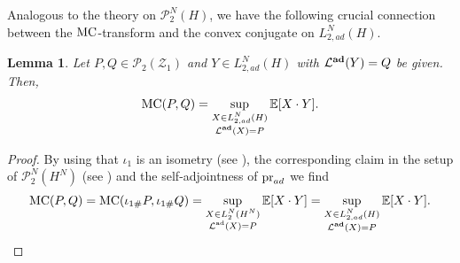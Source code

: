 \documentclass[a4paper]{amsart}
\numberwithin{theorem}{section}
\newtheorem{lemma}[theorem]{Lemma}
\theoremstyle{definition}
\newcommand{\E}{\mathbb{E}}
\newcommand{\pr}{\textup{pr}}
\newcommand{\law}{\mathcal{L}}
\newcommand{\Pc}{\mathcal P}
\renewcommand{\H}{H}
\newcommand{\mc}{\textup{MC}}
\newcommand{\lawad}{\law^{\textup{ad}}}
\newcommand{\Zc}{\mathcal{Z}}
\newcommand{\lawadd}{\law^{\textnormal{\textbf{ad}}}}
\begin{document}
\medskip









Analogous to the theory on $\Pc_2^N(H)$, we have the following crucial connection between the $\mc$-transform and the convex conjugate on $L_{2,ad}^N(\H)$. 

\begin{lemma}\label{lem:FP_XY}
Let $P,Q \in \Pc_2(\Zc_1)$ and $Y \in L_{2,ad}^N(\H)$ with $\lawadd(Y)=Q$ be given. Then,
\[
\mc(P,Q) = \sup_{ \substack{ X \in L_{2,ad}^N(\H) \\
\lawadd(X)=P }} \E[X \cdot Y]. 
\]
\end{lemma}
\begin{proof}
By using that $\iota_1$ is an isometry (see ), the corresponding claim in the setup of $\Pc_2^N(\H^N)$ (see ) and the self-adjointness of $\pr_{ad}$ we find
\begin{align*}
    \mc(P,Q)=\mc(\iota_{1\#}P,\iota_{1\#}Q) = \sup_{ \substack{ X \in L_{2}^N(\H^N) \\\lawad(X)=P }} \E[X \cdot Y] = \sup_{ \substack{ X \in L_{2,ad}^N(\H) \\\lawadd(X)=P }} \E[X \cdot Y]. %
\end{align*}    
\end{proof}
\end{document}
